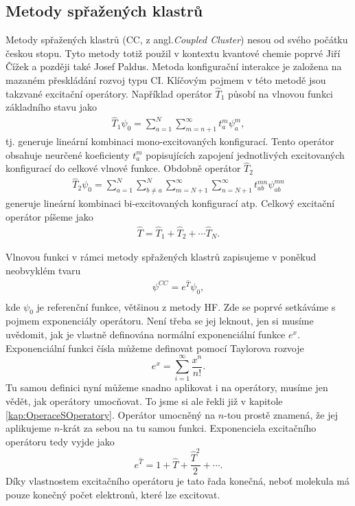 \subsection{Metody spřažených klastrů}
Metody spřažených klastrů (CC, z angl.\textit{Coupled Cluster}) nesou od svého počátku českou stopu. Tyto metody totiž použil v kontextu kvantové chemie poprvé Jiří Čížek a později také Josef Paldus. Metoda konfigurační interakce je založena na mazaném přeskládání rozvoj typu CI. Klíčovým pojmem v této metodě jsou takzvané excitační operátory. Například operátor $\hat{T}_1$ působí na vlnovou funkci základního stavu jako
\begin{eqnarray}
\hat{T}_1\psi_0=\sum^N_{a=1}\sum_{m=n+1}^\infty t_a^m\psi_a^m , 
\end{eqnarray}
tj. generuje lineární kombinaci mono-excitovaných konfigurací.  Tento operátor obsahuje neurčené koeficienty $t_a^m$ popisujících zapojení jednotlivých excitovaných konfigurací do celkové vlnové funkce. Obdobně operátor $\hat{T}_2$ 
\begin{eqnarray}
\hat{T}_2\psi_0=\sum_{a=1}^N \sum_{b\neq a}^N\sum_{m=N+1}^\infty \sum_{n=N+1}^\infty t_{ab}^{mn}\psi_{ab}^{mn}
\end{eqnarray}
generuje lineární kombinaci  bi-excitovaných konfigurací atp. Celkový excitační operátor píšeme jako
\begin{eqnarray}
\hat{T}=\hat{T}_1+\hat{T}_2+\cdots \hat{T}_N.
\end{eqnarray}

Vlnovou funkci v rámci metody spřažených klastrů zapisujeme v poněkud neobvyklém tvaru
\begin{eqnarray}
\psi^{CC} = e^{\hat{T}} \psi_0 ,  \\
\end{eqnarray}
kde $\psi_0$ je referenční funkce, většinou z metody HF. Zde se poprvé setkáváme s pojmem exponenciály operátoru. Není třeba se jej leknout, jen si musíme uvědomit, jak je vlastně definována normální exponenciální funkce $e^x$. Exponenciální funkci čísla můžeme definovat pomocí Taylorova rozvoje
\begin{equation}
e^x=\sum_{i=1}^\infty \frac{x^n}{n!} .
\end{equation}
Tu samou definici nyní můžeme snadno aplikovat i na operátory, musíme jen vědět, jak operátory umocňovat.
To jsme si ale řekli již v kapitole \ref{kap:OperaceSOperatory}. Operátor umocněný na $n$-tou prostě znamená, že jej aplikujeme $n$-krát za sebou na tu samou funkci. Exponenciela excitačního operátoru tedy vyjde jako 
\begin{equation}
e^{\hat{T}} = 1+\hat{T}+\frac{\hat{T}^2}{2}+\cdots.
\end{equation}
Díky vlastnostem excitačního operátoru je tato řada konečná, neboť molekula má pouze konečný počet elektronů, které lze excitovat.

